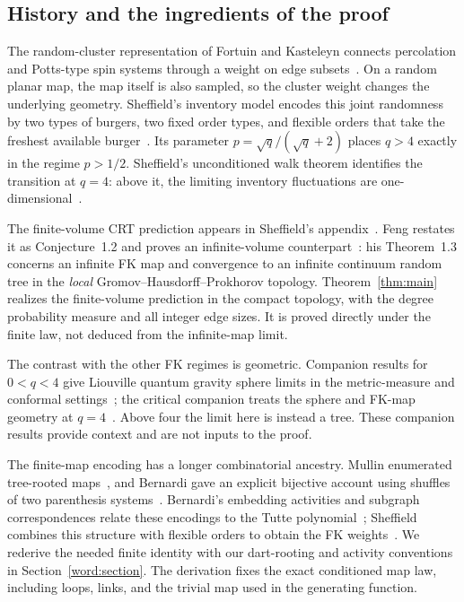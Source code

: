 \subsection{History and the ingredients of the proof}

The random-cluster representation of Fortuin and Kasteleyn connects
percolation and Potts-type spin systems through a weight on edge
subsets~\cite{FortuinKasteleyn1972}. On a random planar map, the map
itself is also sampled, so the cluster weight changes the underlying
geometry. Sheffield's inventory model encodes this joint randomness by
two types of burgers, two fixed order types, and flexible orders that
take the freshest available burger~\cite{Sheffield2016}. Its parameter
$p=\sqrt q/(\sqrt q+2)$ places $q>4$ exactly in the regime $p>1/2$.
Sheffield's unconditioned walk theorem identifies the transition at
$q=4$: above it, the limiting inventory fluctuations are
one-dimensional~\cite[Theorem~2.5]{Sheffield2016}.

The finite-volume CRT prediction appears in Sheffield's
appendix~\cite{Sheffield2016}. Feng restates it as
Conjecture~1.2 and proves an infinite-volume
counterpart~\cite{Feng2026}: his Theorem~1.3 concerns an infinite FK map
and convergence to an infinite continuum random tree in the
\emph{local} Gromov--Hausdorff--Prokhorov topology.
Theorem~\ref{thm:main} realizes the finite-volume prediction in the
compact topology, with the degree probability measure and all integer
edge sizes. It is proved directly under the finite law, not deduced
from the infinite-map limit.

The contrast with the other FK regimes is geometric. Companion results
for $0<q<4$ give Liouville quantum gravity sphere limits in the
metric-measure and conformal settings~\cite{SubcriticalMetric2026,SubcriticalConformal2026};
the critical companion treats the sphere and FK-map geometry at
$q=4$~\cite{CriticalFK2026}. Above four the limit here is instead a
tree. These companion results provide context and are not inputs to
the proof.

The finite-map encoding has a longer combinatorial ancestry. Mullin
enumerated tree-rooted maps~\cite{Mullin1967}, and Bernardi gave an
explicit bijective account using shuffles of two parenthesis
systems~\cite{Bernardi2007}. Bernardi's embedding activities and
subgraph correspondences relate these encodings to the Tutte
polynomial~\cite{Bernardi2008,Bernardi2008Subgraphs}; Sheffield combines
this structure with flexible orders to obtain the FK
weights~\cite[Section~4]{Sheffield2016}. We rederive the needed finite
identity with our dart-rooting and activity conventions in
Section~\ref{word:section}. The derivation fixes the exact conditioned
map law, including loops, links, and the trivial map used in the
generating function.

